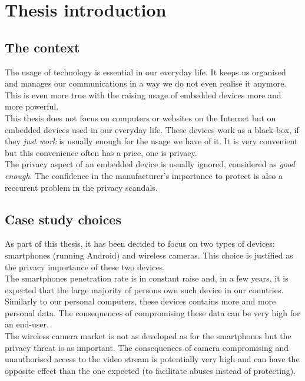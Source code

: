 \chapter{Thesis introduction}

\section{The context}

The usage of technology is essential in our everyday life.
It keeps us organised and manages our communications in a way we do not even realise it anymore.
This is even more true with the raising usage of embedded devices more and more powerful.\\

This thesis does not focus on computers or websites on the Internet but on embedded devices used in our everyday life.
These devices work as a black-box, if they \emph{just work} is usually enough for the usage we have of it.
It is very convenient but this convenience often has a price, one is privacy.\\

The privacy aspect of an embedded device is usually ignored, considered as \emph{good enough}.
The confidence in the manufacturer's importance to protect is also a reccurent problem in the privacy scandals.\\


\section{Case study choices}

As part of this thesis, it has been decided to focus on two types of devices: smartphones (running Android) and wireless cameras.
This choice is justified as the privacy importance of these two devices.\\

The smartphones penetration rate is in constant raise and, in a few years, it is expected that the large majority of persons own such device in our countries.
Similarly to our personal computers, these devices contains more and more personal data.
The consequences of compromising these data can be very high for an end-user.\\

The wireless camera market is not as developed as for the smartphones but the privacy threat is as important.
The consequences of camera compromising and unauthorised access to the video stream is potentially very high and can have the opposite effect than the one expected (to facilitate abuses instead of protecting).\\

